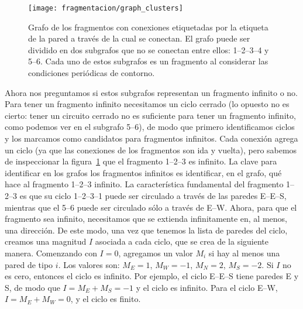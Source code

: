 \begin{figure}  \centering
  \texttt{[image: fragmentacion/graph\_clusters]}
  \caption{Grafo de los fragmentos con conexiones etiquetadas por la etiqueta de la pared a través de la cual se conectan.
    El grafo puede ser dividido en dos subgrafos que no se conectan entre ellos: 1--2--3--4 y 5--6.
    Cada uno de estos subgrafos es un fragmento al considerar las condiciones periódicas de contorno.}
\label{fig:graph_clusters}
\end{figure}

Ahora nos preguntamos si estos subgrafos representan un fragmento infinito o no.
Para tener un fragmento infinito necesitamos un ciclo cerrado (lo opuesto no es cierto: tener un circuito cerrado no es suficiente para tener un fragmento infinito, como podemos ver en el subgrafo 5--6), de modo que primero identificamos ciclos y los marcamos como candidatos para fragmentos infinitos.
Cada conexión agrega un ciclo (ya que las conexiones de los fragmentos son ida y vuelta), pero sabemos de inspeccionar la figura~\ref{fig:graph_clusters} que el fragmento 1--2--3 es infinito.
La clave para identificar en los grafos los fragmentos infinitos es identificar, en el grafo, qué hace al fragmento 1--2--3 infinito.
La característica fundamental del fragmento 1--2--3 es que su ciclo 1--2--3--1 puede ser circulado a través de las paredes E--E--S, mientras que el 5--6 puede ser circulado sólo a través de E--W.
Ahora, para que el fragmento sea infinito, necesitamos que se extienda infinitamente en, al menos, una dirección.
De este modo, una vez que tenemos la lista de paredes del ciclo, creamos una magnitud $I$ asociada a cada ciclo, que se crea de la siguiente manera.
Comenzando con $I=0$, agregamos un valor $M_i$ si hay al menos una pared de tipo $i$.
Los valores son: $M_E= 1$, $M_W = -1$, $M_N = 2$, $M_S = -2$.
Si $I$ no es cero, entonces el ciclo es infinito.
Por ejemplo, el ciclo  E--E--S tiene paredes E y S, de modo que $I = M_E + M_S = -1$ y el ciclo es infinito.
Para el ciclo E--W, $I = M_E + M_W = 0$, y el ciclo es finito.

